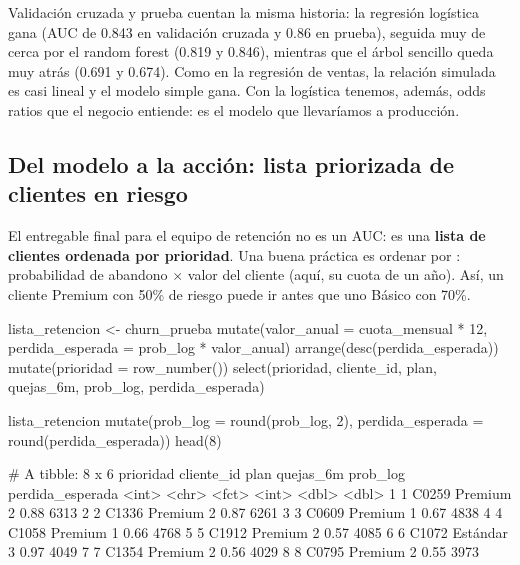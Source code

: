 Validación cruzada y prueba cuentan la misma historia: la regresión logística
gana (AUC de 0.843 en validación cruzada y 0.86 en prueba), seguida muy de
cerca por el random forest (0.819 y 0.846), mientras que el árbol sencillo
queda muy atrás (0.691 y 0.674). Como en la regresión de ventas, la relación
simulada es casi lineal y el modelo simple gana. Con la logística tenemos,
además, odds ratios que el negocio entiende: es el modelo que llevaríamos a
producción.

\subsection{Del modelo a la acción: lista priorizada de clientes en riesgo}

El entregable final para el equipo de retención no es un AUC: es una
\textbf{lista de clientes ordenada por prioridad}. Una buena práctica es
ordenar por : probabilidad de abandono $\times$
valor del cliente (aquí, su cuota de un año). Así, un cliente Premium con 50\%
de riesgo puede ir antes que uno Básico con 70\%.

\begin{rcode}
lista_retencion <- churn_prueba %
  mutate(valor_anual     = cuota_mensual * 12,
         perdida_esperada = prob_log * valor_anual) %
  arrange(desc(perdida_esperada)) %
  mutate(prioridad = row_number()) %
  select(prioridad, cliente_id, plan, quejas_6m, prob_log,
         perdida_esperada)

lista_retencion %
  mutate(prob_log = round(prob_log, 2),
         perdida_esperada = round(perdida_esperada)) %
  head(8)
\end{rcode}

\begin{rsalida}
# A tibble: 8 x 6
  prioridad cliente_id plan     quejas_6m prob_log perdida_esperada
      <int> <chr>      <fct>        <int>    <dbl>            <dbl>
1         1 C0259      Premium          2     0.88             6313
2         2 C1336      Premium          2     0.87             6261
3         3 C0609      Premium          1     0.67             4838
4         4 C1058      Premium          1     0.66             4768
5         5 C1912      Premium          2     0.57             4085
6         6 C1072      Estándar         3     0.97             4049
7         7 C1354      Premium          2     0.56             4029
8         8 C0795      Premium          2     0.55             3973
\end{rsalida}

